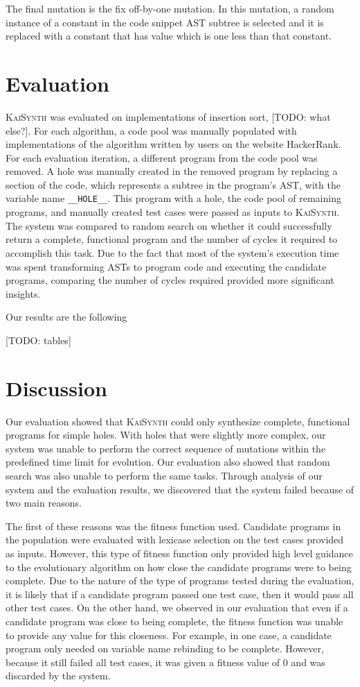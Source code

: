 \documentclass{article}
\begin{document}
The final mutation is the fix off-by-one mutation. In this mutation, a random instance of a constant in the code snippet AST subtree is selected and it is replaced with a constant that has value which is one less than that constant. 


\section{Evaluation}

\textsc{KaiSynth} was evaluated on implementations of insertion sort, [TODO: what else?]. For each algorithm, a code pool was manually populated with implementations of the algorithm written by users on the website HackerRank. For each evaluation iteration, a different program from the code pool was removed. A hole was manually created in the removed program by replacing a section of the code, which represents a subtree in the program's AST, with the variable name \texttt{\_\_HOLE\_\_}. This program with a hole, the code pool of remaining programs, and manually created test cases were passed as inputs to \textsc{KaiSynth}. The system was compared to random search on whether it could successfully return a complete, functional program and the number of cycles it required to accomplish this task. Due to the fact that most of the system's execution time was spent transforming ASTs to program code and executing the candidate programs, comparing the number of cycles required provided more significant insights.

Our results are the following

[TODO: tables]


\section{Discussion}

Our evaluation showed that \textsc{KaiSynth} could only synthesize complete, functional programs for simple holes. With holes that were slightly more complex, our system was unable to perform the correct sequence of mutations within the predefined time limit for evolution. Our evaluation also showed that random search was also unable to perform the same tasks. Through analysis of our system and the evaluation results, we discovered that the system failed because of two main reasons.

The first of these reasons was the fitness function used. Candidate programs in the population were evaluated with lexicase selection on the test cases provided as inputs. However, this type of fitness function only provided high level guidance to the evolutionary algorithm on how close the candidate programs were to being complete. Due to the nature of the type of programs tested during the evaluation, it is likely that if a candidate program passed one test case, then it would pass all other test cases. On the other hand, we observed in our evaluation that even if a candidate program was close to being complete, the fitness function was unable to provide any value for this closeness. For example, in one case, a candidate program only needed on variable name rebinding to be complete. However, because it still failed all test cases, it was given a fitness value of 0 and was discarded by the system. 
\end{document}
